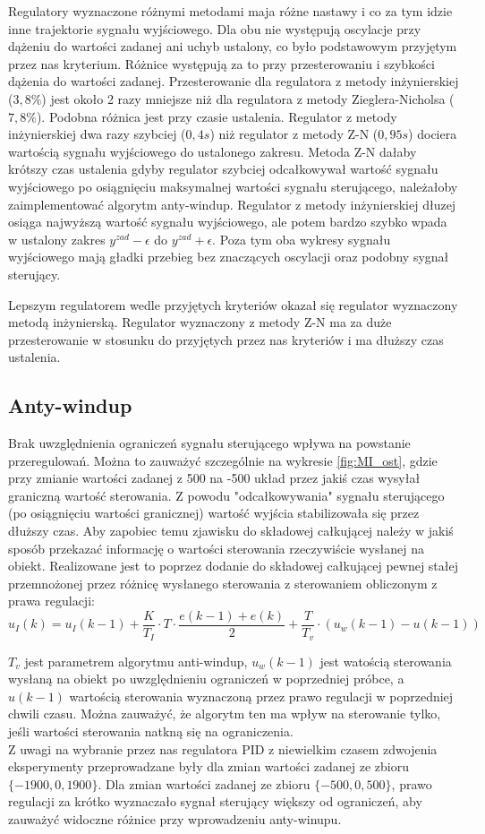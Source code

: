 \documentclass[a4paper, 10pt]{article}
\begin{document}
Regulatory wyznaczone różnymi metodami maja różne nastawy i co za tym idzie inne trajektorie sygnału wyjściowego. Dla obu nie występują oscylacje przy dążeniu do wartości zadanej ani uchyb ustalony, co było podstawowym przyjętym przez nas kryterium. Różnice występują za to przy przesterowaniu i szybkości dążenia do wartości zadanej. Przesterowanie dla regulatora z metody inżynierskiej ($3,8\%$) jest około 2 razy mniejsze niż dla regulatora z metody Zieglera-Nicholsa ($7,8\%$). Podobna różnica jest przy czasie ustalenia. Regulator z metody inżynierskiej dwa razy szybciej ($0,4s$) niż regulator z metody Z-N ($0,95s$) dociera wartością sygnału wyjściowego do ustalonego zakresu. Metoda Z-N dałaby krótszy czas ustalenia gdyby regulator szybciej odcałkowywał wartość sygnału wyjściowego po osiągnięciu maksymalnej wartości sygnału sterującego, należałoby zaimplementować algorytm anty-windup. Regulator z metody inżynierskiej dłuzej osiąga najwyższą wartość sygnału wyjściowego, ale potem bardzo szybko wpada w ustalony zakres $y^{zad}-\epsilon$ do $y^{zad}+\epsilon$. Poza tym oba wykresy sygnału wyjściowego mają gładki przebieg bez znaczących oscylacji oraz podobny sygnał sterujący.

Lepszym regulatorem wedle przyjętych kryteriów okazał się regulator wyznaczony metodą inżynierską. Regulator wyznaczony z metody Z-N ma za duże przesterowanie w stosunku do przyjętych przez nas kryteriów i ma dłuższy czas ustalenia.

\subsection{Anty-windup}
Brak uwzględnienia ograniczeń sygnału sterującego wpływa na powstanie przeregulowań. Można to zauważyć szczególnie na wykresie \ref{fig:MI_ost}, gdzie przy zmianie wartości zadanej z 500 na -500 układ przez jakiś czas wysyłał graniczną wartość sterowania. Z  powodu "odcałkowywania" sygnału sterującego (po osiągnięciu wartości granicznej) wartość wyjścia stabilizowała się przez dłuższy czas. Aby zapobiec temu zjawisku do składowej całkującej należy w jakiś sposób przekazać informację o wartości sterowania rzeczywiście wysłanej na obiekt. Realizowane jest to poprzez dodanie do składowej całkującej pewnej stałej przemnożonej przez różnicę wysłanego sterowania z sterowaniem obliczonym z prawa regulacji:
\[u_{I}(k)=u_{I}(k-1)+\frac{K}{T_{I}} \cdot T\cdot\frac{e(k-1)+e(k)}{2}+\frac{T}{T_{v}}\cdot(u_{w}(k-1)-u(k-1))\]

$T_{v}$  jest parametrem algorytmu anti-windup, $u_{w}(k-1)$ jest watością sterowania wysłaną na obiekt po uwzględnieniu ograniczeń w poprzedniej próbce, a $u(k-1)$ wartością sterowania wyznaczoną przez prawo regulacji w poprzedniej chwili czasu. Można zauważyć, że algorytm ten ma wpływ na sterowanie tylko, jeśli wartości sterowania natkną się na ograniczenia.\\
Z uwagi na  wybranie przez nas regulatora PID z niewielkim czasem zdwojenia eksperymenty przeprowadzane były dla zmian wartości zadanej ze zbioru $\{-1900, 0, 1900\}$. Dla zmian wartości zadanej ze zbioru $\{-500, 0, 500\}$, prawo regulacji za krótko wyznaczało sygnał sterujący większy od ograniczeń, aby zauważyć widoczne różnice przy wprowadzeniu anty-winupu. 
\end{document}
